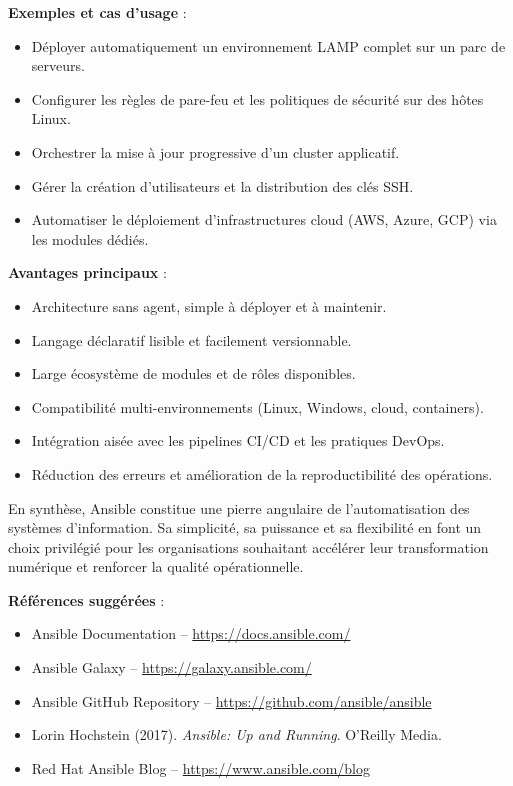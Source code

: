 \textbf{Exemples et cas d’usage} :
\begin{itemize}
	\item Déployer automatiquement un environnement LAMP complet sur un parc de serveurs.
	\item Configurer les règles de pare-feu et les politiques de sécurité sur des hôtes Linux.
	\item Orchestrer la mise à jour progressive d’un cluster applicatif.
	\item Gérer la création d’utilisateurs et la distribution des clés SSH.
	\item Automatiser le déploiement d’infrastructures cloud (AWS, Azure, GCP) via les modules dédiés.
\end{itemize}

\textbf{Avantages principaux} :
\begin{itemize}
	\item Architecture sans agent, simple à déployer et à maintenir.
	\item Langage déclaratif lisible et facilement versionnable.
	\item Large écosystème de modules et de rôles disponibles.
	\item Compatibilité multi-environnements (Linux, Windows, cloud, containers).
	\item Intégration aisée avec les pipelines CI/CD et les pratiques DevOps.
	\item Réduction des erreurs et amélioration de la reproductibilité des opérations.
\end{itemize}

En synthèse, Ansible constitue une pierre angulaire de l’automatisation des systèmes d’information. Sa simplicité, sa puissance et sa flexibilité en font un choix privilégié pour les organisations souhaitant accélérer leur transformation numérique et renforcer la qualité opérationnelle.

\textbf{Références suggérées} :
\begin{itemize}
	\item Ansible Documentation – \url{https://docs.ansible.com/}
	\item Ansible Galaxy – \url{https://galaxy.ansible.com/}
	\item Ansible GitHub Repository – \url{https://github.com/ansible/ansible}
	\item Lorin Hochstein (2017). \textit{Ansible: Up and Running}. O’Reilly Media.
	\item Red Hat Ansible Blog – \url{https://www.ansible.com/blog}
\end{itemize}

